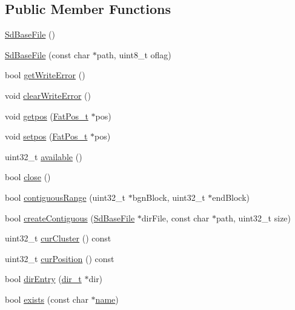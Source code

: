 \subsection*{Public Member Functions}
\begin{DoxyCompactItemize}
\item 
\hyperlink{class_sd_base_file_a2806f9763006e9191678b4e33097b47d}{Sd\+Base\+File} ()
\item 
\hyperlink{class_sd_base_file_a94d44fc448dc8a06867d490100a57781}{Sd\+Base\+File} (const char $\ast$path, uint8\+\_\+t oflag)
\item 
bool \hyperlink{class_sd_base_file_aa8ebd3ec28126c3171059d3e7dd355b9}{get\+Write\+Error} ()
\item 
void \hyperlink{class_sd_base_file_a6b4e639ae03ec48c9becd8b472aa1b50}{clear\+Write\+Error} ()
\item 
void \hyperlink{class_sd_base_file_ad1af089e5cf0a4c86e9b6bae1595f59b}{getpos} (\hyperlink{struct_fat_pos__t}{Fat\+Pos\+\_\+t} $\ast$pos)
\item 
void \hyperlink{class_sd_base_file_a71170390855df02c88cbda6e727e9609}{setpos} (\hyperlink{struct_fat_pos__t}{Fat\+Pos\+\_\+t} $\ast$pos)
\item 
uint32\+\_\+t \hyperlink{class_sd_base_file_ac4381fe633716069f2161d9e9fef5d16}{available} ()
\item 
bool \hyperlink{class_sd_base_file_a17f7e949aa0f80d89782d8e31f5edc15}{close} ()
\item 
bool \hyperlink{class_sd_base_file_a272c68ba97eb5452ce903e6f8d2895a6}{contiguous\+Range} (uint32\+\_\+t $\ast$bgn\+Block, uint32\+\_\+t $\ast$end\+Block)
\item 
bool \hyperlink{class_sd_base_file_ad14a78d348219d6ce096582b6ed74526}{create\+Contiguous} (\hyperlink{class_sd_base_file}{Sd\+Base\+File} $\ast$dir\+File, const char $\ast$path, uint32\+\_\+t size)
\item 
uint32\+\_\+t \hyperlink{class_sd_base_file_afd2ed78a03600924ef6502a86d7c6291}{cur\+Cluster} () const 
\item 
uint32\+\_\+t \hyperlink{class_sd_base_file_a9739ca25a7c804cace68f95c14658c44}{cur\+Position} () const 
\item 
bool \hyperlink{class_sd_base_file_a0977fc620f90e21897eca1fb1c25fdce}{dir\+Entry} (\hyperlink{_sd_fat_structs_8h_a803db59d4e16a0c54a647afc6a7954e3}{dir\+\_\+t} $\ast$dir)
\item 
bool \hyperlink{class_sd_base_file_aa0b95ccc568d483f1416d2eacd1ff3f7}{exists} (const char $\ast$\hyperlink{_sd_fat_structs_8h_a30308c9b983377042fd2cc8900454fb1}{name})

\end{DoxyCompactItemize}
